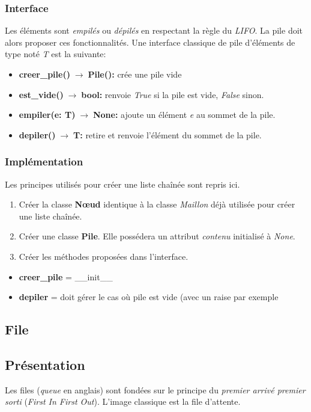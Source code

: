 \documentclass[a4paper,11pt]{article}
\begin{document}
\begin{Form}
\subsubsection{Interface}
Les éléments sont \emph{empilés} ou \emph{dépilés} en respectant la règle du \emph{LIFO}. La pile doit alors proposer ces fonctionnalités. Une interface classique de pile  d'éléments de type noté \emph{T} est la suivante:
\begin{itemize}
\item \textbf{creer\_pile()$\;\rightarrow\;$Pile():} crée une pile vide
\item \textbf{est\_vide()$\;\rightarrow\;$bool:} renvoie \emph{True} si la pile est vide, \emph{False} sinon.
\item \textbf{empiler(e: T)$\;\rightarrow\;$None:} ajoute un élément \emph{e} au sommet de la pile.
\item \textbf{depiler()$\;\rightarrow\;$T:} retire et renvoie l'élément du sommet de la pile.
\end{itemize}
\subsubsection{Implémentation}
Les principes utilisés pour créer une liste chaînée sont repris ici.
\begin{activite}
\begin{enumerate}
\item Créer la classe \textbf{Nœud} identique à la classe \emph{Maillon} déjà utilisée pour créer une liste chaînée.
\item Créer une classe \textbf{Pile}. Elle possédera un attribut \emph{contenu} initialisé à \emph{None}.
\item Créer les méthodes proposées dans l'interface.
\end{enumerate}
\end{activite}
\begin{commentprof}
\begin{itemize}
\item \textbf{creer\_pile} = \_\_init\_\_
\item \textbf{depiler} = doit gérer le cas où pile est vide (avec un raise par exemple
\end{itemize}
\end{commentprof}
\subsection{File}
\subsection{Présentation}
Les files (\emph{queue} en anglais) sont fondées sur le principe du \emph{premier arrivé premier sorti} (\emph{First In First Out}). L'image classique est la file d'attente.
\begin{figure}[!h]
\centering
{}
\end{figure}
\end{Form}
\end{document}
